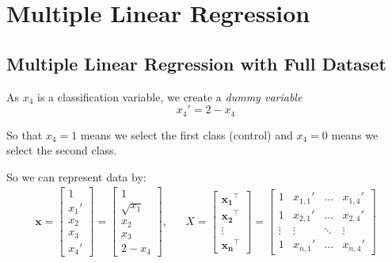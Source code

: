 \section{Multiple Linear Regression}


\subsection{Multiple Linear Regression with Full Dataset}

As $x_4$ is a classification variable, we create a \textit{dummy variable}
\begin{equation}
    x_4' = 2 - x_4
\end{equation}

So that $x_4 = 1$ means we select the first class (control) and $x_4 = 0$ means we select the second class.

So we can represent data by:
\begin{equation}
\begin{aligned}
\boldsymbol{x} = \begin{bmatrix}
    1\\x_1' \\ x_2 \\ x_3 \\ x_4'
\end{bmatrix}=\begin{bmatrix}
    1\\\sqrt{x_1} \\ x_2 \\ x_3 \\ 2 - x_4
\end{bmatrix}, && X = \begin{bmatrix}
    \boldsymbol{x_1}^\top \\ \boldsymbol{x_2}^\top \\ \vdots \\\boldsymbol{x_n}^\top
\end{bmatrix} = \begin{bmatrix}
    1 & x_{1,1}' & \ldots & x_{1,4}' \\ 1 & x_{2,1}' & \ldots & x_{2,4}' \\ \vdots & \vdots &\ddots &\vdots \\ 1 & x_{n,1}' & \ldots & x_{n,4}'
\end{bmatrix}
\end{aligned}
\end{equation}

